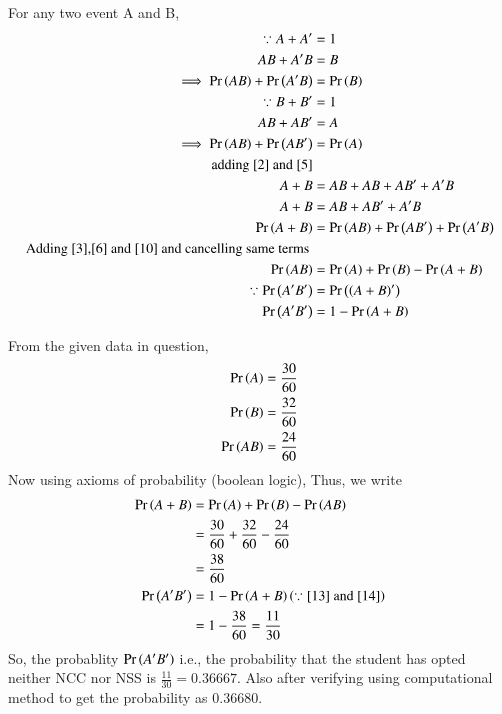 \documentclass[journal]{IEEEtran}
\begin{document}
 For any two event A and B,
\begin{align}
	\because A + A^\prime &= 1 \\
	 AB + A^\prime B &= B \label{2} \\
	 \implies \Pr\left(AB\right) + \Pr\left(A^\prime B\right) &= \Pr\left(B\right) \label{3} \\
	 \because B + B^\prime &= 1 \\
	 AB + AB^\prime &= A \label{5}\\
	 \implies \Pr\left(AB\right) + \Pr\left(AB^\prime\right) &= \Pr\left(A\right) \label{6} \\
	 \text{adding } \eqref{2} \text{ and } \eqref{5} \\
	 A + B &= AB + AB + AB^\prime + A^\prime B  \\
	 A + B &= AB + AB^\prime + A^\prime B \\ 
	 \Pr\left(A + B\right) &= \Pr\left(AB\right) + \Pr\left(AB^\prime\right) + \Pr\left(A^\prime B\right) \label{10}\\
	 \text{Adding \eqref{3},\eqref{6} and \eqref{10} and cancelling same terms } \\
	 \Pr\left(AB\right) &= \Pr\left(A\right) + \Pr\left(B\right) - \Pr\left(A + B\right) \\
	 \because \Pr\left(A^\prime B^\prime\right) &=  \Pr\left(\left(A + B\right)^\prime\right) \label{13} \\
	 \Pr\left(A^\prime  B^\prime\right) &=  1 - \Pr\left(A+B\right) \label{14}
\end{align}



From the given data in question,
    \begin{align}
        \Pr\left(A\right) &= \frac{30}{60} \\
        \Pr\left(B\right) &= \frac{32}{60} \\
        \Pr\left(AB\right) &= \frac{24}{60}     
    \end{align}
Now using axioms of probability (boolean logic),
Thus, we write
    \begin{align}
	    \Pr\left(A + B\right) &= \Pr\left(A\right) +  \Pr\left(B\right) - \Pr\left(A B\right) \\
	                                 &= \frac{30}{60} + \frac{32}{60} - \frac{24}{60} \\
	                                 &= \frac{38}{60} \\
	     \Pr\left(A^\prime  B^\prime\right) &=  1 - \Pr\left(A+B\right) \left(\because \eqref{13} \text{ and } \eqref{14}\right) \\ 
	                              &= 1- \frac{38}{60} = \frac{11}{30} 
    \end{align} 
So, the probablity $\Pr\left(A^\prime  B^\prime\right)$ i.e., the probability that the student has opted neither NCC nor NSS is $\frac{11}{30} = 0.36667$.
Also after verifying using computational method to get the probability as 0.36680.
\end{document}

